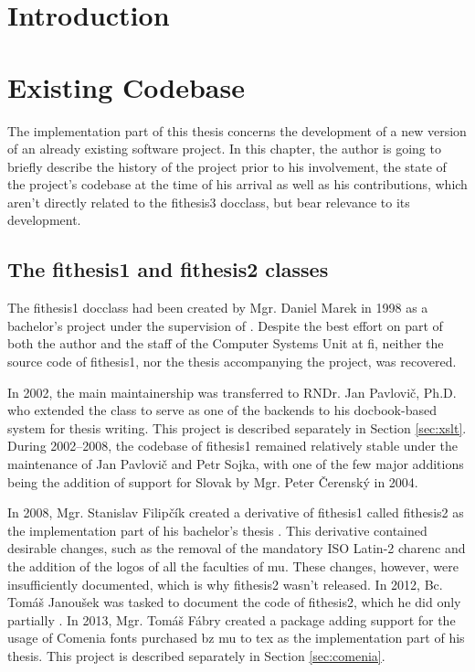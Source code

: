 \documentclass[12pt,twoside,cover,color,table]%
  {fithesis3/fithesis3/fithesis3} %
\makeatletter
\def\thesis#1{\makeatletter\thesis@{#1}\makeatother}
\makeatother
\begin{document}
\chapter{Introduction}
\chapter{Existing Codebase}\label{sec:init-state}
  The implementation part of this thesis concerns the development
  of a new version of an already existing software project. In this
  chapter, the author is going to briefly describe the history of
  the project prior to his involvement, the state of the project's
  codebase at the time of his arrival as well as his contributions,
  which aren't directly related to the \textsf{fithesis3}
  \gls{docclass}, but bear relevance to its development.

  \section{The \textsf{fithesis1} and \textsf{fithesis2}
    classes}
  The \textsf{fithesis1} \gls{docclass} had been created by Mgr.
  Daniel Marek in 1998 as a bachelor's project under the
  supervision of \thesis{advisor}. Despite the best effort on part
  of both the author and the staff of the Computer Systems Unit at
  \gls{fi}, neither the source code of \textsf{fithesis1}, nor the
  thesis accompanying the project, was recovered.

  In 2002, the main maintainership was transferred to RNDr. Jan
  Pavlovič, Ph.D. who extended the class to serve as one of the
  backends to his \gls{docbook}-based system for thesis writing.
  This project is described separately in Section \ref{sec:xslt}.
  During 2002--2008, the codebase of \textsf{fithesis1} remained
  relatively stable under the maintenance of Jan Pavlovič and Petr
  Sojka, with one of the few major additions being the addition of
  support for Slovak by Mgr. Peter Čerenský in 2004.

  In 2008, Mgr. Stanislav Filipčík created a derivative of
  \textsf{fithesis1} called \textsf{fithesis2} as the
  implementation part of his bachelor's thesis \cite{Filipcik09}.
  This derivative contained desirable changes, such as the removal
  of the mandatory ISO Latin-2 \gls{charenc} and the addition of
  the logos of all the faculties of \gls{mu}. These changes,
  however, were insufficiently documented, which is why
  \textsf{fithesis2} wasn't released. In 2012, Bc. Tomáš Janoušek
  was tasked to document the code of \textsf{fithesis2}, which he
  did only partially \cite{fithesis2Code}. In 2013, Mgr. Tomáš
  Fábry created a package adding support for the usage of Comenia
  fonts purchased bz \gls{mu} to \gls{tex} as the implementation
  part of his thesis. This project is described separately in
  Section \ref{sec:comenia}.
\end{document}
